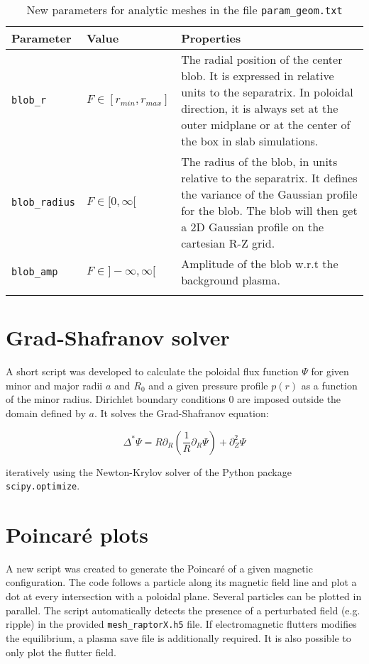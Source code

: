 \begin{longtable}[!h]{>{\raggedright\arraybackslash}p{}p{}>{\raggedright\arraybackslash}p{}}
	Parameter & Value & Properties 
	\\ \hline 
	\endhead	
	\texttt{blob\_r}& $F\in [r_{min},r_{max}]$ & The radial position of the center blob. It is expressed in relative units to the separatrix. In poloidal direction, it is always set at the outer midplane or at the center of the box in slab simulations.
	\\ \hline 
	\texttt{blob\_radius} & $F\in [0,\infty[$ & The radius of the blob, in units relative to the separatrix. It defines the variance of the Gaussian profile for the blob. The blob will then get a 2D Gaussian profile on the cartesian R-Z grid.
	\\ \hline 
	\texttt{blob\_amp} & $F\in ]-\infty,\infty[$ & Amplitude of the blob w.r.t the background plasma. 		
	\\ \hline
	\caption[New parameters for analytic meshes]{New parameters for analytic meshes in the file \texttt{param\_geom.txt}}
\end{longtable}


\section{Grad-Shafranov solver}
\label{sec:app_GradShafranovSolver}

A short script was developed to calculate the poloidal flux function $\Psi$ for given minor and major radii $a$ and $R_0$ and a given pressure profile $p(r)$ as a function of the minor radius. Dirichlet boundary conditions 0 are imposed outside the domain defined by $a$. It solves the Grad-Shafranov equation: 

\begin{equation}
	\Delta^* \Psi = R\partial_R\left(\frac{1}{R}\partial_R\Psi\right) + \partial_Z^2\Psi
\end{equation}

iteratively using the Newton-Krylov solver of the Python package \texttt{scipy.optimize}.


\section{Poincaré plots}
\label{sec:app_PoincarePlots}

A new script was created to generate the Poincaré of a given magnetic configuration. The code follows a particle along its magnetic field line and plot a dot at every intersection with a poloidal plane. Several particles can be plotted in parallel. The script automatically detects the presence of a perturbated field (e.g. ripple) in the provided \texttt{mesh\_raptorX.h5} file. If electromagnetic flutters modifies the equilibrium, a plasma save file is additionally required. It is also possible to only plot the flutter field. \\

